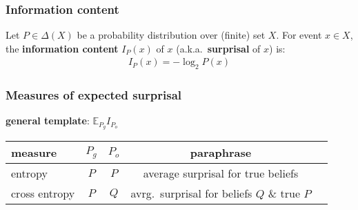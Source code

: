 \documentclass[fleqn,10pt,serif,xcolor=svgnames,xcolor=table,aspectratio=169,handout]{beamer}
\renewcommand{\markdef}[1]{\textcolor{themecolor}{\textbf{#1}}}
\begin{document}
\begin{frame}
  \frametitle{Information content}

  Let $P\in \Delta(X)$ be a probability distribution over (finite) set $X$.
  For event $x \in X$, the \markdef{information content} $I_{P}(x)$ of $x$ (a.k.a.~\markdef{surprisal} of $x$) is:
  \begin{align*}
    I_{P}(x) = - \log_{2} P(x)
  \end{align*}

  \bigskip

  \begin{flushright}
  \end{flushright}
\end{frame}


\begin{frame}
  \frametitle{Measures of expected surprisal}


  \markdef{general template}: $\mathds{E}_{P_{g}} I_{P_{o}}$

  \bigskip
  \bigskip
  \bigskip

  \begin{center}
    \begin{tabular}[lcccp{4cm}]{lcccp{5cm}}
      measure       & $P_{g}$ & $P_{o}$  & paraphrase \\ \midrule
      entropy       & $P$     & $P$      & \footnotesize{average surprisal for true beliefs} \\
      cross entropy & $P$     & $Q$      & \footnotesize{avrg.~surprisal for beliefs $Q$ \& true $P$}\\
    \end{tabular}
  \end{center}

\end{frame}
\end{document}
